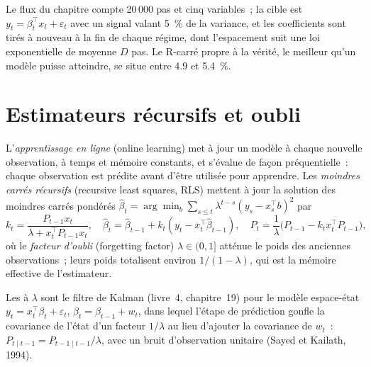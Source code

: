 Le flux du chapitre compte 20\,000 pas et cinq variables~; la cible est $y_t = \beta_t^\top x_t + \varepsilon_t$ avec un
signal valant 5~\% de la variance, et les coefficients sont tirés à nouveau à la fin de chaque régime, dont l'espacement suit une loi exponentielle de
moyenne $D$ pas. Le R-carré propre à la vérité, le meilleur qu'un modèle puisse atteindre, se situe entre 4.9 et 5.4~\%.

\section{Estimateurs récursifs et oubli}

\begin{definition}\label{def:ml:online-learning-and-drift:rls}
L'\emph{apprentissage en ligne} (online learning) met à jour un modèle à chaque nouvelle observation, à temps et mémoire constants,
et s'évalue de façon préquentielle~: chaque observation est prédite avant d'être utilisée pour apprendre. Les \emph{moindres carrés
récursifs} (recursive least squares, RLS) mettent à jour la solution des moindres carrés pondérés
$\hat\beta_t = \arg\min_b\sum_{s\le t}\lambda^{t-s}(y_s - x_s^\top b)^2$ par
\[
k_t = \frac{P_{t-1}x_t}{\lambda + x_t^\top P_{t-1}x_t},\quad \hat\beta_t = \hat\beta_{t-1} + k_t(y_t - x_t^\top\hat\beta_{t-1}),\quad
P_t = \frac{1}{\lambda}\bigl(P_{t-1} - k_tx_t^\top P_{t-1}\bigr),
\]
où le \emph{facteur d'oubli} (forgetting factor) $\lambda\in(0,1]$ atténue le poids des anciennes observations~; leurs poids totalisent
environ $1/(1-\lambda)$, qui est la mémoire effective de l'estimateur.
\end{definition}

\begin{proposition}\label{prop:ml:online:kalman}
Les  à  $\lambda$ sont le filtre de Kalman (livre~4, chapitre~19) pour le modèle espace-état $y_t =
x_t^\top\beta_t + \varepsilon_t$, $\beta_t = \beta_{t-1} + w_t$, dans lequel l'étape de prédiction gonfle la covariance de l'état
d'un facteur $1/\lambda$ au lieu d'ajouter la covariance de $w_t$~: $P_{t\mid t-1} = P_{t-1\mid t-1}/\lambda$, avec un bruit d'observation
unitaire (Sayed et Kailath, 1994).
\end{proposition}

